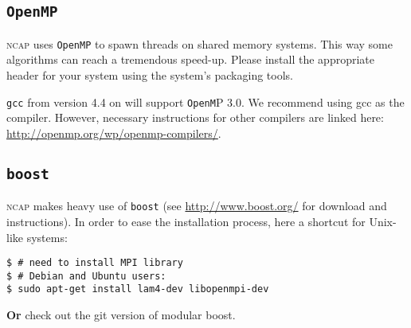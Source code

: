 \subsection{\texttt{OpenMP}}

\textsc{ncap} uses \texttt{OpenMP} to spawn threads on shared memory systems. This way some algorithms can reach a tremendous speed-up. Please install the appropriate header for your system using the system's packaging tools.

\texttt{gcc} from version 4.4 on will support \texttt{OpenM}P 3.0. We recommend using gcc as the compiler. However, necessary instructions for other compilers are linked here: \url{http://openmp.org/wp/openmp-compilers/}.

\subsection{\texttt{boost}}

\textsc{ncap} makes heavy use of \texttt{boost} (see \url{http://www.boost.org/} for download and instructions). In order to ease the installation process, here a shortcut for Unix-like systems:

\begin{lstlisting}[style=shell]
$ # need to install MPI library
$ # Debian and Ubuntu users:
$ sudo apt-get install lam4-dev libopenmpi-dev
\end{lstlisting}
\textbf{Or} check out the git version of modular boost.


